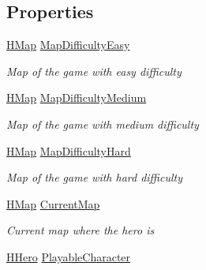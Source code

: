 \subsection*{Properties}
\begin{DoxyCompactItemize}
\item 
\hyperlink{class_hel_project_1_1_game_world_1_1_map_1_1_h_map}{H\+Map} \hyperlink{class_hel_project_1_1_u_i_1_1_play_screen_a6fa66d24cfdc2801ecfd0e72f1c1669b}{Map\+Difficulty\+Easy}
\begin{DoxyCompactList}\small\item\em Map of the game with easy difficulty \end{DoxyCompactList}\item 
\hyperlink{class_hel_project_1_1_game_world_1_1_map_1_1_h_map}{H\+Map} \hyperlink{class_hel_project_1_1_u_i_1_1_play_screen_a4dc67a0bb9e4dfc7fabcb35e45529771}{Map\+Difficulty\+Medium}
\begin{DoxyCompactList}\small\item\em Map of the game with medium difficulty \end{DoxyCompactList}\item 
\hyperlink{class_hel_project_1_1_game_world_1_1_map_1_1_h_map}{H\+Map} \hyperlink{class_hel_project_1_1_u_i_1_1_play_screen_a8dd43c45856c0c6ed338e214e4009d2d}{Map\+Difficulty\+Hard}
\begin{DoxyCompactList}\small\item\em Map of the game with hard difficulty \end{DoxyCompactList}\item 
\hyperlink{class_hel_project_1_1_game_world_1_1_map_1_1_h_map}{H\+Map} \hyperlink{class_hel_project_1_1_u_i_1_1_play_screen_ad7c470e2c8f452c734ec3dc1fa6e3061}{Current\+Map}
\begin{DoxyCompactList}\small\item\em Current map where the hero is \end{DoxyCompactList}\item 
\hyperlink{class_hel_project_1_1_game_world_1_1_entities_1_1_h_hero}{H\+Hero} \hyperlink{class_hel_project_1_1_u_i_1_1_play_screen_a404ed230e991ee3a7563c23fc053f383}{Playable\+Character}

\end{DoxyCompactItemize}
